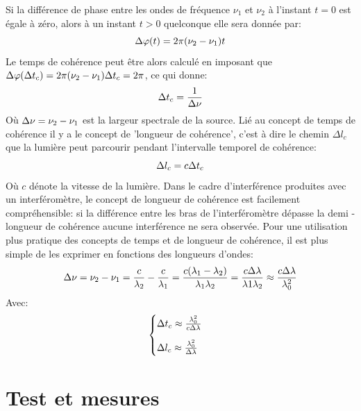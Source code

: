 \documentclass[11pt, openright]{book}
\begin{document}
					Si la différence de phase entre les ondes de fréquence $\nu_1$ et $\nu_2$ à l'instant $t=0$ est égale à zéro, alors à un instant $t>0$ quelconque elle sera donnée par: 
					\begin{equation*}
						\displaystyle{\Delta\varphi(t)=2\pi(\nu_2-\nu_1)t}
					\end{equation*}
					Le temps de cohérence peut être alors calculé en imposant que $\displaystyle{\Delta\varphi(\Delta t_c)=2\pi(\nu_2-\nu_1)\Delta t_c=2\pi}$, ce qui donne: 
					\begin{equation*}
						\displaystyle{\Delta t_c=\frac{1}{\Delta\nu}}
					\end{equation*}
					Où $\displaystyle{\Delta\nu=\nu_2-\nu_1}$ est la largeur spectrale de la source. Lié au concept de temps de cohérence il y a le concept de 'longueur de cohérence', c'est à dire le chemin $\Delta l_c$ que la lumière peut parcourir pendant l'intervalle temporel de cohérence: 
					\begin{equation*}
						\displaystyle{\Delta l_c=c\Delta t_c}
					\end{equation*}
					Où $c$ dénote la vitesse de la lumière. Dans le cadre d'interférence produites avec un interféromètre, le concept de longueur de cohérence est facilement compréhensible: si la différence entre les bras de l'interféromètre dépasse la demi - longueur de cohérence aucune interférence ne sera observée. Pour une utilisation plus pratique des concepts de temps et de longueur de cohérence, il est plus simple de les exprimer en fonctions des longueurs d'ondes: 
					\begin{equation*}
						\displaystyle{\Delta \nu=\nu_2-\nu_1=\frac{c}{\lambda_2}-\frac{c}{\lambda_1}=\frac{c(\lambda_1-\lambda_2)}{\lambda_1\lambda_2}=\frac{c\Delta\lambda}{\lambda1\lambda_2}\approx \frac{c\Delta\lambda}{\lambda_{0}^2}}
					\end{equation*}
					Avec: 
					\begin{equation*}
						\begin{aligned}
							\begin{cases}
								\Delta t_c \approx \frac{\lambda_{0}^2}{c\Delta\lambda}\\
								\noalign{\vskip9pt}
								\Delta l_c \approx \frac{\lambda_{0}^2}{\Delta\lambda}
							\end{cases}							
						\end{aligned}
					\end{equation*}

			\section{Test et mesures}
			
\end{document}

